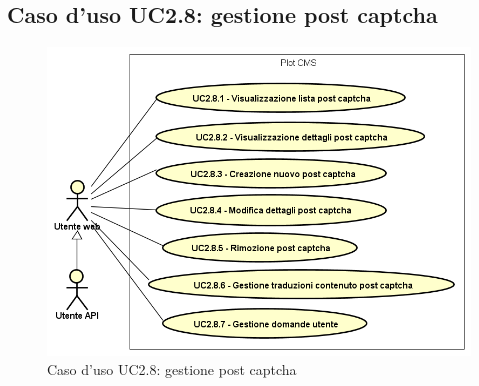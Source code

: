 \subsection{Caso d'uso UC2.8: gestione post captcha}

        \begin{figure}
            \centering
            \includegraphics[scale=0.95, width=\textwidth]{immagini/usecase/UC2-8.png}
            \caption{Caso d'uso UC2.8: gestione post captcha}\label{fig:UC2.8} 
        \end{figure}
